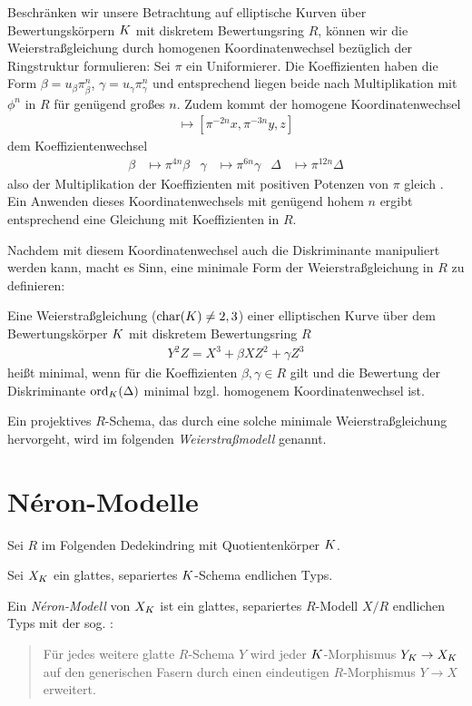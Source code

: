 \documentclass[german]{scrreprt}
\begin{document}
Beschränken wir unsere Betrachtung auf elliptische Kurven über
Bewertungskörpern $K$ mit diskretem Bewertungsring $R$, können wir
die Weierstraßgleichung durch homogenen Koordinatenwechsel bezüglich
der Ringstruktur formulieren:
Sei $\pi$ ein Uniformierer.
Die Koeffizienten haben die Form $\beta=u_\beta\pi^n_\beta$, $\gamma=u_\gamma\pi^n_\gamma$ und
entsprechend liegen beide nach Multiplikation mit $\phi^n$ in $R$ für
genügend großes $n$. Zudem kommt der homogene Koordinatenwechsel
\begin{gather*}
  [x,y,z] \longmapsto [\pi^{-2n}x, \pi^{-3n}y, z]
\end{gather*}
dem Koeffizientenwechsel
\begin{align*}
  \beta&\mapsto \pi^{4n}\beta
  &\gamma&\mapsto \pi^{6n}\gamma
  &\Delta&\mapsto \pi^{12n}\Delta
\end{align*}
also der Multiplikation der Koeffizienten mit positiven Potenzen von
$\pi$ gleich \cite[1.5, Lemma 2]{neron}.
Ein Anwenden dieses Koordinatenwechsels mit genügend hohem $n$ ergibt
entsprechend eine Gleichung mit Koeffizienten in $R$.

Nachdem mit diesem Koordinatenwechsel auch die Diskriminante
manipuliert werden kann, macht es Sinn, eine minimale Form der
Weierstraßgleichung in $R$ zu definieren:
\begin{Definition}
  Eine Weierstraßgleichung ($\operatorname{char}(K)\neq2,3$) einer elliptischen
  Kurve über dem Bewertungskörper $K$ mit diskretem Bewertungsring $R$
  \begin{gather*}
    Y^2Z = X^3 + \beta XZ^2 + \gamma Z^3
  \end{gather*}
  heißt minimal, wenn für die Koeffizienten $\beta, \gamma\in R$ gilt
  und die Bewertung der Diskriminante $\operatorname{ord}_{K}(\Delta)$ minimal
  bzgl. homogenem Koordinatenwechsel ist.
  \cite[Chapter 1.5, S.\,22]{neron}
\end{Definition}

Ein projektives $R$-Schema, das durch eine solche minimale
Weierstraßgleichung hervorgeht, wird im folgenden
\emph{Weierstraßmodell} genannt.



\chapter{Néron-Modelle}
Sei $R$ im Folgenden Dedekindring mit Quotientenkörper $K$.

\begin{Definition}
  Sei $X_{K}$ ein glattes, separiertes $K$-Schema endlichen Typs.

  Ein \emph{Néron-Modell} von $X_{K}$ ist ein glattes, separiertes
  $R$-Modell $X/R$ endlichen Typs mit der
  sog. \NAbbEig:
  \begin{quote}
    Für jedes weitere glatte $R$-Schema $Y$ wird jeder
    $K$-Morphismus $Y_{K}\to X_{K}$ auf den generischen Fasern durch
    einen eindeutigen $R$-Morphismus $Y\to X$ erweitert.
  \end{quote}
  \cite[1.2, Definition 1]{neron}
\end{Definition}
\end{document}

